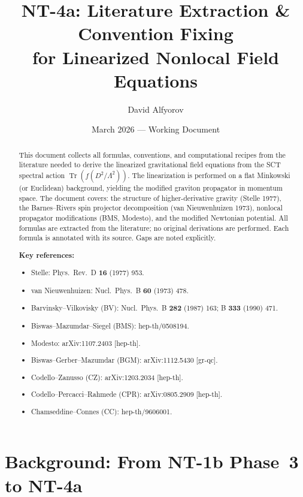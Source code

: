 \documentclass[12pt,a4paper]{article}
\title{\textbf{NT-4a: Literature Extraction \& Convention Fixing\\[4pt]
       for Linearized Nonlocal Field Equations}}
\author{David Alfyorov}
\date{March 2026 --- Working Document}
\theoremstyle{definition}
\theoremstyle{remark}
\newcommand{\Tr}{\operatorname{Tr}}
\begin{document}
\maketitle

\begin{center}
\end{center}

\thispagestyle{empty}

\begin{abstract}
This document collects all formulas, conventions, and computational
recipes from the literature needed to derive the linearized
gravitational field equations from the SCT spectral action
$\Tr(f(D^2/\Lambda^2))$.  The linearization is performed on a flat
Minkowski (or Euclidean) background, yielding the modified graviton
propagator in momentum space.  The document covers: the structure of
higher-derivative gravity (Stelle 1977), the Barnes--Rivers spin
projector decomposition (van Nieuwenhuizen 1973), nonlocal propagator
modifications (BMS, Modesto), and the modified Newtonian potential.
All formulas are extracted from the literature; no original derivations
are performed.  Each formula is annotated with its source.
Gaps are noted explicitly.

\medskip\noindent
\textbf{Key references:}
\begin{itemize}[nosep]
\item Stelle: Phys.\ Rev.\ D \textbf{16} (1977) 953.
\item van Nieuwenhuizen: Nucl.\ Phys.\ B \textbf{60} (1973) 478.
\item Barvinsky--Vilkovisky (BV): Nucl.\ Phys.\ B \textbf{282} (1987)
  163; B \textbf{333} (1990) 471.
\item Biswas--Mazumdar--Siegel (BMS): hep-th/0508194.
\item Modesto: arXiv:1107.2403 [hep-th].
\item Biswas--Gerber--Mazumdar (BGM): arXiv:1112.5430 [gr-qc].
\item Codello--Zanusso (CZ): arXiv:1203.2034 [hep-th].
\item Codello--Percacci--Rahmede (CPR): arXiv:0805.2909 [hep-th].
\item Chamseddine--Connes (CC): hep-th/9606001.
\end{itemize}
\end{abstract}

\tableofcontents
\newpage

\section{Background: From NT-1b Phase~3 to NT-4a}
\label{sec:background}
\end{document}
